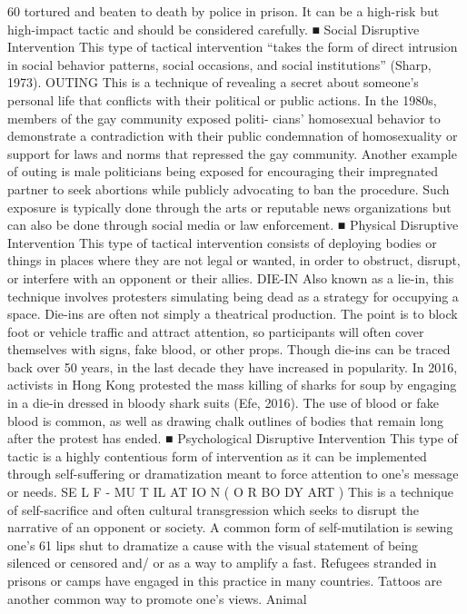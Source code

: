 \documentclass[twoside,a4paper,12pt,fleqn,openany]{extbook}
\begin{document}
60
tortured and beaten to death by police in prison. It can be a high-risk but high-impact tactic
and should be considered carefully.
■ Social Disruptive Intervention
This type of tactical intervention “takes the form of direct intrusion in social behavior patterns,
social occasions, and social institutions” (Sharp, 1973).
OUTING
This is a technique of revealing a secret about someone’s personal life that conflicts with
their political or public actions. In the 1980s, members of the gay community exposed politi-
cians’ homosexual behavior to demonstrate a contradiction with their public condemnation
of homosexuality or support for laws and norms that repressed the gay community. Another
example of outing is male politicians being exposed for encouraging their impregnated
partner to seek abortions while publicly advocating to ban the procedure. Such exposure is
typically done through the arts or reputable news organizations but can also be done through
social media or law enforcement.
■ Physical Disruptive Intervention
This type of tactical intervention consists of deploying bodies or things in places where they
are not legal or wanted, in order to obstruct, disrupt, or interfere with an opponent or their allies.
DIE-IN
Also known as a lie-in, this technique involves protesters simulating being dead as a strategy
for occupying a space. Die-ins are often not simply a theatrical production. The point is to
block foot or vehicle traffic and attract attention, so participants will often cover themselves
with signs, fake blood, or other props. Though die-ins can be traced back over 50 years, in
the last decade they have increased in popularity. In 2016, activists in Hong Kong protested
the mass killing of sharks for soup by engaging in a die-in dressed in bloody shark suits (Efe,
2016). The use of blood or fake blood is common, as well as drawing chalk outlines of bodies
that remain long after the protest has ended.
■ Psychological Disruptive Intervention
This type of tactic is a highly contentious form of intervention as it can be implemented through
self-suffering or dramatization meant to force attention to one’s message or needs.
SE L F - MU T IL AT IO N ( O R BO DY ART )
This is a technique of self-sacrifice and often cultural transgression which seeks to disrupt
the narrative of an opponent or society. A common form of self-mutilation is sewing one’s
61
lips shut to dramatize a cause with the visual statement of being silenced or censored and/
or as a way to amplify a fast. Refugees stranded in prisons or camps have engaged in this
practice in many countries. Tattoos are another common way to promote one’s views. Animal
\end{document}

